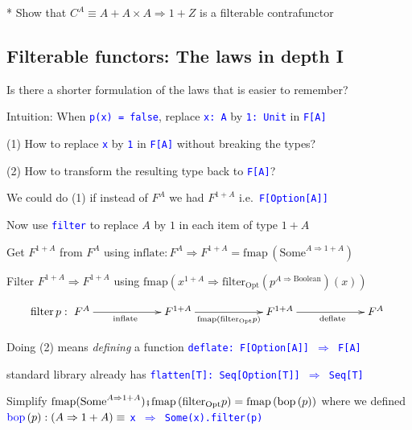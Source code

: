{*} Show that $C^{A}\equiv A+A\times A\Rightarrow1+Z$ is a filterable
contrafunctor


\subsection{Filterable functors: The laws in depth I}

Is there a shorter formulation of the laws that is easier to remember?

Intuition: When \texttt{\textcolor{blue}{\footnotesize{}p(x) = false}},
replace \texttt{\textcolor{blue}{\footnotesize{}x:\ A}} by \texttt{\textcolor{blue}{\footnotesize{}1:\ Unit}}
in \texttt{\textcolor{blue}{\footnotesize{}F{[}A{]}}} 

(1) How to replace \texttt{\textcolor{blue}{\footnotesize{}x}} by
\texttt{\textcolor{blue}{\footnotesize{}1}} in \texttt{\textcolor{blue}{\footnotesize{}F{[}A{]}}}
without breaking the types?

(2) How to transform the resulting type back to \texttt{\textcolor{blue}{\footnotesize{}F{[}A{]}}}?

We could do (1) if instead of $F^{A}$ we had $F^{1+A}$ i.e.~\texttt{\textcolor{blue}{\footnotesize{}F{[}Option{[}A{]}{]}}} 

Now use \texttt{\textcolor{blue}{\footnotesize{}filter}} to replace
$A$ by $1$ in each item of type $1+A$

Get $F^{1+A}$ from $F^{A}$ using $\text{inflate}:F^{A}\Rightarrow F^{1+A}=\text{fmap}\,(\text{Some}^{A\Rightarrow1+A})$ 

Filter $F^{1+A}\Rightarrow F^{1+A}$ using $\text{fmap}\left(x^{1+A}\Rightarrow\text{filter}_{\text{Opt}}(p^{A\Rightarrow\text{Boolean}})(x)\right)$

\[
\text{filter}\,p:\xymatrix{\xyScaleX{5pc}F^{A}\ar[r]\sb(0.45){\text{inflate}} & F^{1+A}\ar[r]_{\text{fmap}\left(\text{filter}_{\text{Opt}}p\right)} & F^{1+A}\ar[r]\sb(0.55){\text{deflate}} & F^{A}}
\]

Doing (2) means \emph{defining} a function \texttt{\textcolor{blue}{\footnotesize{}deflate:\ F{[}Option{[}A{]}{]}
$\Rightarrow$ F{[}A{]}}} 

standard library already has \texttt{\textcolor{blue}{\footnotesize{}flatten{[}T{]}:\ Seq{[}Option{[}T{]}{]}
$\Rightarrow$ Seq{[}T{]}}} 

Simplify{\footnotesize{} $\text{fmap}(\text{Some}^{A\Rightarrow1+A})\bef\text{fmap}\left(\text{filter}_{\text{Opt}}p\right)=\text{fmap}\left(\text{bop}\left(p\right)\right)$}
where we defined {\footnotesize{}$\text{{\color{blue}bop}}\left(p\right):\left(A\Rightarrow1+A\right)\equiv$}
\texttt{\textcolor{blue}{\footnotesize{}x $\Rightarrow$ Some(x).filter(p)}} 

